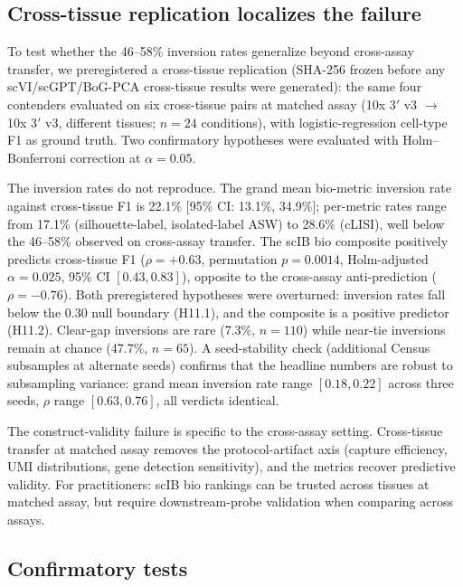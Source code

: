 \documentclass[10pt,letterpaper]{article}
\begin{document}
\subsection{Cross-tissue replication localizes the failure}
\label{sec:crosstissue}

To test whether the 46--58\% inversion rates generalize beyond cross-assay transfer, we preregistered a cross-tissue replication (SHA-256 frozen before any scVI/scGPT/BoG-PCA cross-tissue results were generated): the same four contenders evaluated on six cross-tissue pairs at matched assay (10x 3$'$ v3 $\rightarrow$ 10x 3$'$ v3, different tissues; $n = 24$ conditions), with logistic-regression cell-type F1 as ground truth. Two confirmatory hypotheses were evaluated with Holm--Bonferroni correction at $\alpha = 0.05$.

The inversion rates do not reproduce. The grand mean bio-metric inversion rate against cross-tissue F1 is 22.1\% [95\% CI: 13.1\%, 34.9\%]; per-metric rates range from 17.1\% (silhouette-label, isolated-label ASW) to 28.6\% (cLISI), well below the 46--58\% observed on cross-assay transfer. The scIB bio composite positively predicts cross-tissue F1 ($\rho = +0.63$, permutation $p = 0.0014$, Holm-adjusted $\alpha = 0.025$, 95\% CI $[0.43, 0.83]$), opposite to the cross-assay anti-prediction ($\rho = -0.76$). Both preregistered hypotheses were overturned: inversion rates fall below the 0.30 null boundary (H11.1), and the composite is a positive predictor (H11.2). Clear-gap inversions are rare (7.3\%, $n = 110$) while near-tie inversions remain at chance (47.7\%, $n = 65$). A seed-stability check (additional Census subsamples at alternate seeds) confirms that the headline numbers are robust to subsampling variance: grand mean inversion rate range $[0.18, 0.22]$ across three seeds, $\rho$ range $[0.63, 0.76]$, all verdicts identical.

The construct-validity failure is specific to the cross-assay setting. Cross-tissue transfer at matched assay removes the protocol-artifact axis (capture efficiency, UMI distributions, gene detection sensitivity), and the metrics recover predictive validity. For practitioners: scIB bio rankings can be trusted across tissues at matched assay, but require downstream-probe validation when comparing across assays.


\subsection{Confirmatory tests}
\label{sec:confirmatory}
\end{document}
